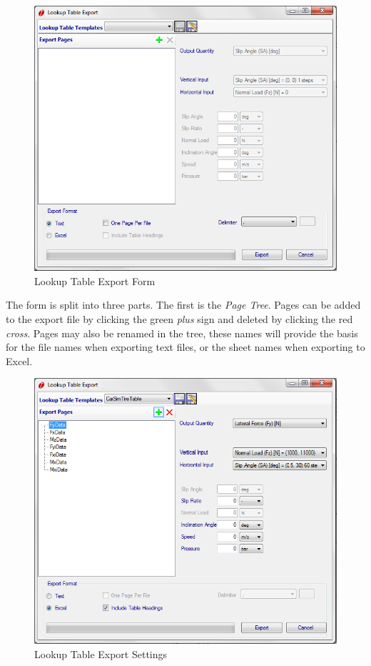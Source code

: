 \begin{figure}[H]
	\centering
		\includegraphics[width=1.0\textwidth]{LookupExportForm.png}
	\caption{Lookup Table Export Form}
	\label{fig:LookupExportForm}
\end{figure}

The form is split into three parts. The first is the \textsl{Page Tree}. Pages can be added to the export file by clicking the green \textsl{plus} sign and deleted by clicking the red \textsl{cross}. Pages may also be renamed in the tree, these names will provide the basis for the file names when exporting text files, or the sheet names when exporting to Excel. 

\begin{figure}[H]
	\centering
		\includegraphics[width=1.0\textwidth]{LookupExportFormPopulated.png}
	\caption{Lookup Table Export Settings}
	\label{fig:LookupExportFormPopulated}
\end{figure}

